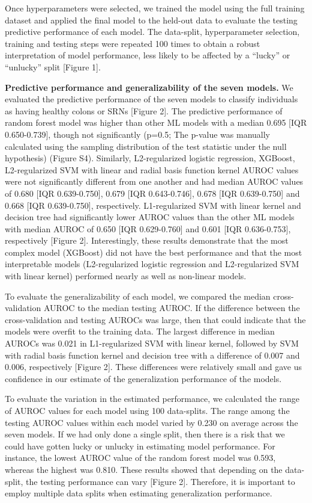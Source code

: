 \documentclass[
  11pt,
]{article}
\begin{document}
Once hyperparameters were selected, we trained the model using the full
training dataset and applied the final model to the held-out data to
evaluate the testing predictive performance of each model. The
data-split, hyperparameter selection, training and testing steps were
repeated 100 times to obtain a robust interpretation of model
performance, less likely to be affected by a ``lucky'' or ``unlucky''
split {[}Figure 1{]}.

\textbf{Predictive performance and generalizability of the seven
models.} We evaluated the predictive performance of the seven models to
classify individuals as having healthy colons or SRNs {[}Figure 2{]}.
The predictive performance of random forest model was higher than other
ML models with a median 0.695 {[}IQR 0.650-0.739{]}, though not
significantly (p=0.5; The p-value was manually calculated using the
sampling distribution of the test statistic under the null hypothesis)
(Figure S4). Similarly, L2-regularized logistic regression, XGBoost,
L2-regularized SVM with linear and radial basis function kernel AUROC
values were not significantly different from one another and had median
AUROC values of 0.680 {[}IQR 0.639-0.750{]}, 0.679 {[}IQR
0.643-0.746{]}, 0.678 {[}IQR 0.639-0.750{]} and 0.668 {[}IQR
0.639-0.750{]}, respectively. L1-regularized SVM with linear kernel and
decision tree had significantly lower AUROC values than the other ML
models with median AUROC of 0.650 {[}IQR 0.629-0.760{]} and 0.601 {[}IQR
0.636-0.753{]}, respectively {[}Figure 2{]}. Interestingly, these
results demonstrate that the most complex model (XGBoost) did not have
the best performance and that the most interpretable models
(L2-regularized logistic regression and L2-regularized SVM with linear
kernel) performed nearly as well as non-linear models.

To evaluate the generalizability of each model, we compared the median
cross-validation AUROC to the median testing AUROC. If the difference
between the cross-validation and testing AUROCs was large, then that
could indicate that the models were overfit to the training data. The
largest difference in median AUROCs was 0.021 in L1-regularized SVM with
linear kernel, followed by SVM with radial basis function kernel and
decision tree with a difference of 0.007 and 0.006, respectively
{[}Figure 2{]}. These differences were relatively small and gave us
confidence in our estimate of the generalization performance of the
models.

To evaluate the variation in the estimated performance, we calculated
the range of AUROC values for each model using 100 data-splits. The
range among the testing AUROC values within each model varied by 0.230
on average across the seven models. If we had only done a single split,
then there is a risk that we could have gotten lucky or unlucky in
estimating model performance. For instance, the lowest AUROC value of
the random forest model was 0.593, whereas the highest was 0.810. These
results showed that depending on the data-split, the testing performance
can vary {[}Figure 2{]}. Therefore, it is important to employ multiple
data splits when estimating generalization performance.
\end{document}
